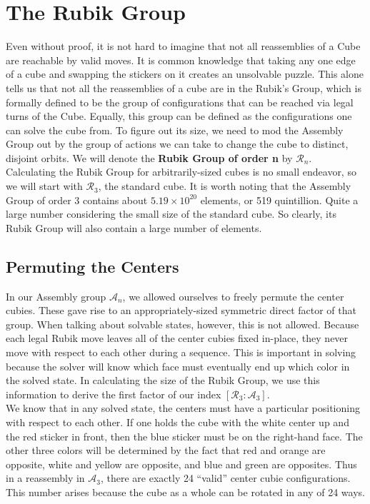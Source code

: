 \documentclass[10pt,letterpaper]{report}
\begin{document}
\section{The Rubik Group}
Even without proof, it is not hard to imagine that not all reassemblies of a Cube are reachable by valid moves.  It is common knowledge that taking any one edge of a cube and swapping the stickers on it creates an unsolvable puzzle.  This alone tells us that not all the reassemblies of a cube are in the Rubik's Group, which is formally defined to be the group of configurations that can be reached via legal turns of the Cube.  Equally, this group can be defined as the configurations one can solve the cube from.  To figure out its size, we need to mod the Assembly Group out by the group of actions we can take to change the cube to distinct, disjoint orbits.  We will denote the \textbf{Rubik Group of order n} by $\mathcal{R}_n$. \\

Calculating the Rubik Group for arbitrarily-sized cubes is no small endeavor, so we will start with $\mathcal{R}_3$, the standard cube.  It is worth noting that the Assembly Group of order 3 contains about $5.19 \times 10^{20}$ elements, or 519 quintillion.  Quite a large number considering the small size of the standard cube.  So clearly, its Rubik Group will also contain a large number of elements.

\subsection{Permuting the Centers}

In our Assembly group $\mathcal{A}_n$, we allowed ourselves to freely permute the center cubies.  These gave rise to an appropriately-sized symmetric direct factor of that group.  When talking about solvable states, however, this is not allowed.  Because each legal Rubik move leaves all of the center cubies fixed in-place, they never move with respect to each other during a sequence.  This is important in solving because the solver will know which face must eventually end up which color in the solved state.  In calculating the size of the Rubik Group, we use this information to derive the first factor of our index $[\mathcal{R}_3 : \mathcal{A}_3]$. \\

We know that in any solved state, the centers must have a particular positioning with respect to each other.  If one holds the cube with the white center up and the red sticker in front, then the blue sticker must be on the right-hand face.  The other three colors will be determined by the fact that red and orange are opposite, white and yellow are opposite, and blue and green are opposites.  Thus in a reassembly in $\mathcal{A}_3$, there are exactly 24 ``valid'' center cubie configurations.  This number arises because the cube as a whole can be rotated in any of 24 ways. \\
\end{document}

